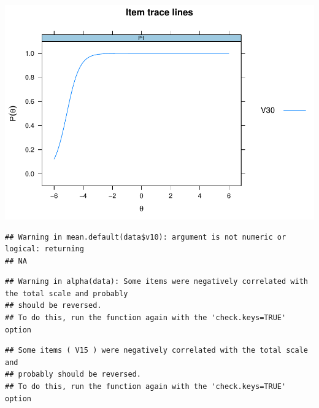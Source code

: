 \documentclass[
  english,
  man,floatsintext]{apa6}
\begin{document}
\includegraphics{papaja-test_files/figure-latex/unnamed-chunk-5-2.pdf}

\begin{verbatim}
## Warning in mean.default(data$v10): argument is not numeric or logical: returning
## NA
\end{verbatim}

\begin{verbatim}
## Warning in alpha(data): Some items were negatively correlated with the total scale and probably 
## should be reversed.  
## To do this, run the function again with the 'check.keys=TRUE' option
\end{verbatim}

\begin{verbatim}
## Some items ( V15 ) were negatively correlated with the total scale and 
## probably should be reversed.  
## To do this, run the function again with the 'check.keys=TRUE' option
\end{verbatim}
\end{document}
